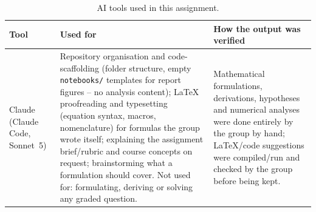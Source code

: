 %
%

\begin{table}[H]
  \centering
  \begin{tabularx}{\textwidth}{lXX}
    \toprule
    \textbf{Tool} & \textbf{Used for} & \textbf{How the output was verified} \\
    \midrule
    Claude (Claude Code, Sonnet~5)
    &
    Repository organisation and code-scaffolding (folder structure, empty \texttt{notebooks/}
    templates for report figures -- no analysis content); LaTeX proofreading and typesetting
    (equation syntax, macros, nomenclature) for formulas the group wrote itself; explaining the
    assignment brief/rubric and course concepts on request; brainstorming what a formulation
    should cover. Not used for: formulating, deriving or solving any graded question.
    &
    Mathematical formulations, derivations, hypotheses and numerical analyses were done
    entirely by the group by hand; LaTeX/code suggestions were compiled/run and checked by the
    group before being kept.
    \\
    \bottomrule
  \end{tabularx}
  \caption{AI tools used in this assignment.}
  \label{tab:ai}
\end{table}
